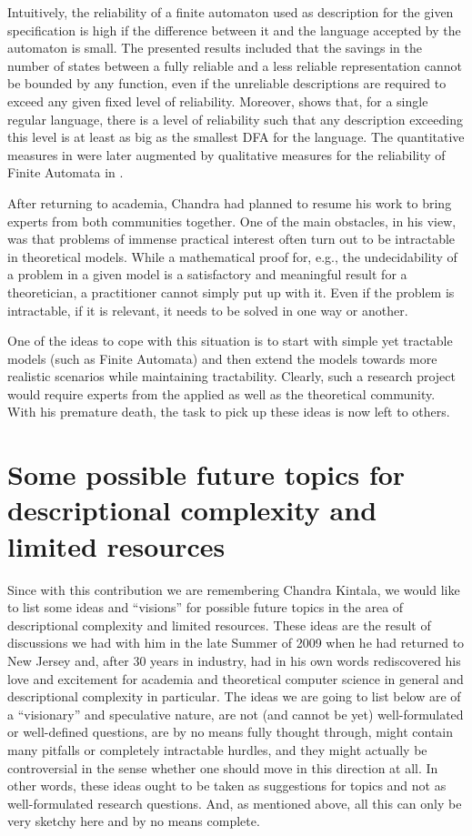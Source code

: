 \documentclass[copyright]{eptcs}
\begin{document}
Intuitively, the reliability of a finite automaton used as description
for the given specification is high if the difference between it and
the language accepted by the automaton is small. The presented results
included that the savings in the number of states between a fully
reliable and a less reliable representation cannot be bounded by any
function, even if the unreliable descriptions are required to exceed
any given fixed level of reliability. Moreover, \cite{KappesK04} shows
that, for a single regular language, there is a level of reliability
such that any description exceeding this level is at least as big as
the smallest DFA for the language. The quantitative measures in
\cite{KappesK04}  were later augmented by qualitative measures for the
reliability of Finite Automata in \cite{KappesN05}.

After returning to academia, Chandra had planned to resume his work to
bring experts from both communities together. One of the main
obstacles, in his view, was that problems of immense practical
interest often turn out to be intractable in theoretical models. While
a mathematical proof for, e.g., the undecidability of a problem in
a given model is a satisfactory and meaningful result for a
theoretician, a practitioner cannot simply put up with it. Even if the
problem is intractable, if it is relevant, it needs to be solved in one
way or another.

One of the ideas to cope with this situation is to start with simple yet
tractable models (such as Finite Automata) and then extend the models
towards more realistic scenarios while maintaining tractability.
Clearly, such a research project would require experts from the applied
as well as the theoretical community. With his
premature death, the task to pick up these
ideas is now left to others. 


\section{Some possible future topics for descriptional complexity and limited resources}\label{s:future}

Since with this contribution we are remembering Chandra Kintala, we would like to list some ideas and ``visions''
for possible future topics in the area of descriptional complexity and limited resources. These ideas are the
result of discussions we had with him in the late Summer of 2009 when he had returned to New Jersey and, after
30 years in industry, had in his own words rediscovered his love and excitement for academia and theoretical
computer science in general and descriptional complexity in particular. The ideas we are going to list below
are of a ``visionary'' and speculative nature, are not (and cannot be yet) well-formulated or well-defined questions, 
are by no means fully thought through, might contain many pitfalls or completely intractable hurdles, and they might 
actually be controversial in the sense whether one should move in this direction at all. In other words, these ideas 
ought to be taken as suggestions for topics and not as well-formulated research questions. And, as mentioned above, 
all this can only be very sketchy here and by no means complete.
\end{document}
